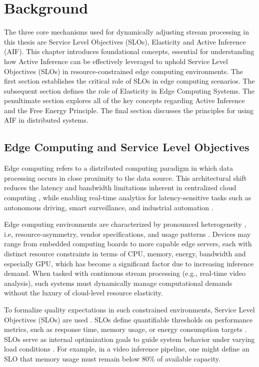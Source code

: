 \chapter{Background}

The three core mechanisms used for dynamically adjusting stream processing in this thesis are Service Level Objectives (SLOs), Elasticity and Active Inference (AIF). This chapter introduces foundational concepts, essential for understanding how Active Inference
can be effectively leveraged to uphold Service Level Objectives (SLOs) in resource-constrained
edge computing environments. The first section establishes the critical role of SLOs in edge computing scenarios. The subsequent section defines the role of Elasticity in Edge Computing Systems. The penultimate section explores all of the key concepts regarding Active Inference and the Free Energy Principle. The final section discusses the principles for using AIF in distributed systems.

\section{Edge Computing and Service Level Objectives}
Edge computing refers to a distributed computing paradigm in which data processing occurs in
close proximity to the data source. This architectural shift reduces the latency and bandwidth
limitations inherent in centralized cloud computing \cite{deng_edge_2020}, while enabling real-time
analytics for latency-sensitive tasks such as autonomous driving, smart surveillance, and
industrial automation \cite{zhang_octopus_2023}.

Edge computing environments are characterized by pronounced heterogeneity \cite{furst_elastic_2018} , i.e, resource-asymmetry, vendor specifications, and usage patterns \cite{danilenka_adaptive_2025}. Devices may range from embedded computing boards to more capable edge servers, each
with distinct resource constraints in terms of CPU, memory, energy, bandwidth and especially GPU, which has become a significant factor due to increasing inference demand. When tasked with continuous stream
processing (e.g., real-time video analysis), such systems must dynamically manage
computational demands without the luxury of cloud-level resource elasticity.

To formalize quality expectations in such constrained environments, Service Level Objectives
(SLOs) are used \cite{casamayor_pujol_deepslos_2024}. SLOs define quantifiable thresholds on performance metrics, such as
response time, memory usage, or energy consumption targets \cite{danilenka_adaptive_2025}. SLOs serve as internal optimization goals \cite{danilenka_adaptive_2025} to guide system behavior under varying load conditions \cite{nastic_sloc_2020}.
For example, in a video inference pipeline, one
might define an SLO that memory usage must remain below 80\% of available capacity.

